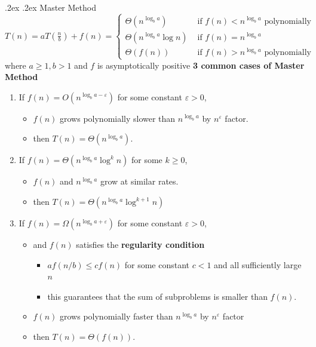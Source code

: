\documentclass[10pt,landscape,a4paper]{article}
\makeatletter
\renewcommand{\subsection}{\@startsection{subsection}{1}{0mm}%
    {.2ex}%
    {.2ex}%
    {\sffamily\bfseries}}
\makeatother
\begin{document}
\begin{multicols*}{4}
	\subsection{Master Method}
	\begin{math}
		T(n) = aT(\frac{n}{b}) + f(n) = \begin{cases}
			\Theta(n^{\log_ba}) & \text{ if } f(n) < n^{\log_ba} \text{ polynomially}
			\\ \Theta(n^{\log_ba} \log n) & \text{ if } f(n) = n^{\log_ba} 
			\\ \Theta(f(n)) & \text{ if } f(n) > n^{\log_ba} \text{ polynomially}
		\end{cases}
	\end{math} 
	where $a\geq 1, b>1$ and $f$ is asymptotically positive
	\textbf{3 common cases of Master Method}
	\begin{enumerate}
		\item If $f(n) = O(n^{\log_b a-\varepsilon})$ for some constant  $\varepsilon > 0$, 
		\begin{itemize}
			\item $f(n)$ grows polynomially slower than $n^{\log_ba}$ by $n^\varepsilon$ factor.
			\item then $T(n) = \Theta(n^{\log_ba})$.
		\end{itemize}
		\item If $f(n) = \Theta(n^{\log_ba} \log^kn) $ for some $k \geq 0$,
		\begin{itemize}
			\item $f(n)$ and $n^{\log_ba}$ grow at similar rates.
			\item then $T(n) = \Theta(n^{\log_ba}\log^{k+1} n)$
		\end{itemize}
		\item If $f(n) = \Omega(n^{\log_ba + \varepsilon})$ for some constant $\varepsilon > 0$, 
		\begin{itemize}
			\item and $f(n)$ satisfies the \textbf{regularity condition} 
			\begin{itemize}
				\item $af(n/b) \leq cf(n)$ for some constant $c<1$ and all sufficiently large $n$
				\item this guarantees that the sum of subproblems is smaller than $f(n)$.
			\end{itemize} 
			\item $f(n)$ grows polynomially faster than $n^{\log_ba}$ by $n^\varepsilon$ factor
			\item then $T(n) = \Theta(f(n))$.
		\end{itemize}
	\end{enumerate}

\end{multicols*}
\end{document}
